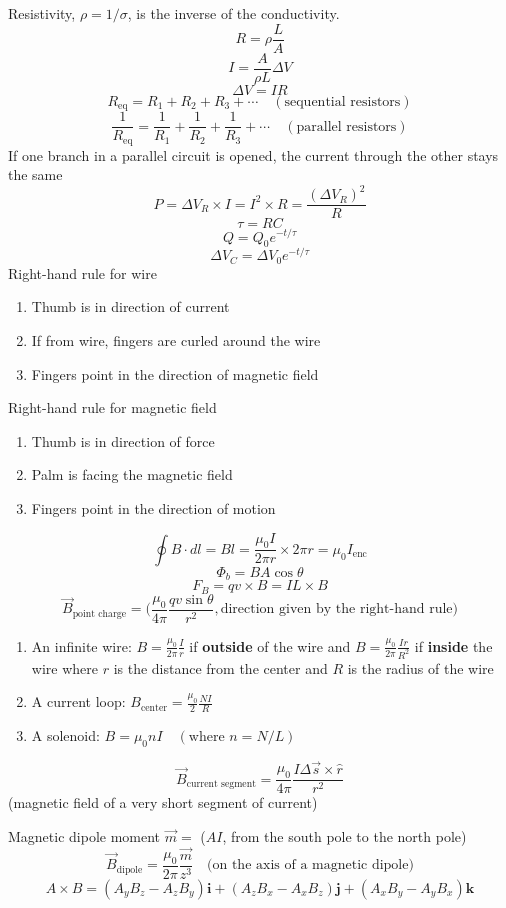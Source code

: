 \documentclass[twocolumn]{article}
\begin{document}
Resistivity, $\rho = 1/\sigma$, is the inverse of the conductivity.
\[R=\rho \frac{L}{A}\]
\[I=\frac{A}{\rho L}\Delta V\]
\[\Delta V = IR\]
\[R_\text{eq}=R_1 + R_2 + R_3 + \cdots\quad (\text{sequential resistors})\]
\[\frac{1}{R_\text{eq}}=\frac{1}{R_1} + \frac{1}{R_2} + \frac{1}{R_3} + \cdots\quad
(\text{parallel resistors})\]
If one branch in a parallel circuit is opened, the current through the other stays the same
\[P=\Delta V_R\times I = I^2\times R = \frac{{(\Delta V_R)}^2}{R}\]
\[\tau = RC\]
\[Q=Q_0 e^{-t/\tau}\]
\[\Delta V_C=\Delta V_0 e^{-t/\tau}\]
Right-hand rule for wire
\begin{enumerate}
    \item Thumb is in direction of current
    \item If from wire, fingers are curled around the wire
    \item Fingers point in the direction of magnetic field
\end{enumerate}
Right-hand rule for magnetic field
\begin{enumerate}
    \item Thumb is in direction of force
    \item Palm is facing the magnetic field
    \item Fingers point in the direction of motion
\end{enumerate}
\[\oint B\cdot dl = Bl = \frac{\mu_0 I}{2\pi r}\times 2\pi r = \mu_0 I_\text{enc}\]
\[\Phi_b = BA\cos\theta\]
\[F_B=qv\times B=IL\times B\]
\[\vec{B}_\text{point charge}=\Big(\frac{\mu_0}{4\pi}\frac{qv\sin \theta}{r^2},
\text{direction given by the right-hand rule}\Big)\]
\begin{enumerate}
    \item An infinite wire: $B=\frac{\mu_0}{2\pi}\frac{I}{r}$ if \textbf{outside} of the wire and
    $B=\frac{\mu_0}{2\pi}\frac{Ir}{R^2}$ if \textbf{inside} the wire where $r$ is the distance from
    the center and $R$ is the radius of the wire
    \item A current loop: $B_\text{center}=\frac{\mu_0}{2}\frac{NI}{R}$
    \item A solenoid: $B=\mu_0 nI\quad(\text{where }n=N/L)$
\end{enumerate}

\[\vec{B}_\text{current segment}=\frac{\mu_0}{4\pi}\frac{I\Delta \vec{s}\times \hat{r}}{r^2}\]
\quad(magnetic field of a very short segment of current)
\vspace{1em}

Magnetic dipole moment $\vec{m}=$ ($AI$, from the south pole to the north pole)
\[\vec{B}_\text{dipole}=\frac{\mu_0}{2\pi}\frac{\vec{m}}{z^3}\quad
\text{(on the axis of a magnetic dipole)}\]
\[A\times B = (A_yB_z - A_zB_y)\mathbf{i}+(A_zB_x-A_xB_z)\mathbf{j}+(A_xB_y-A_yB_x)\mathbf{k}\]
\end{document}
